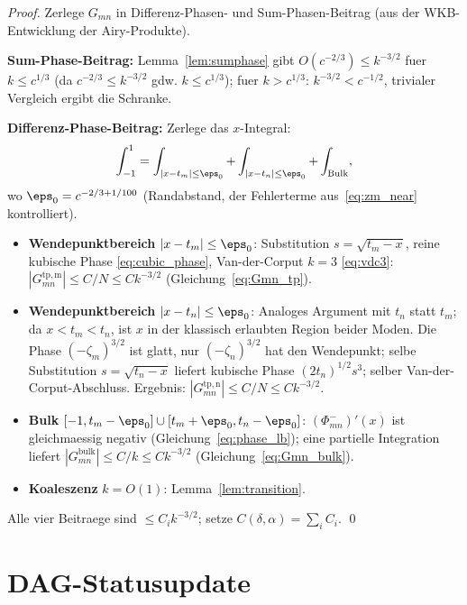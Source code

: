 \documentclass[12pt,a4paper]{amsart}
\theoremstyle{definition}
\newcommand{\zn}{\zeta_n}
\newcommand{\zm}{\zeta_m}
\newcommand{\tn}{t_n}
\newcommand{\tm}{t_m}
\newcommand{\Pm}{\Phi^-_{mn}}
\begin{document}
\begin{proof}
Zerlege $G_{mn}$ in Differenz-Phasen- und Sum-Phasen-Beitrag
(aus der WKB-Entwicklung der Airy-Produkte).

\textbf{Sum-Phase-Beitrag:} Lemma~\ref{lem:sumphase} gibt $O(c^{-2/3}) \le k^{-3/2}$
fuer $k \le c^{1/3}$ (da $c^{-2/3} \le k^{-3/2}$ gdw. $k \le c^{1/3}$);
fuer $k > c^{1/3}$: $k^{-3/2} < c^{-1/2}$, trivialer Vergleich ergibt die Schranke.

\textbf{Differenz-Phase-Beitrag:}
Zerlege das $x$-Integral:
\[
  \int_{-1}^{1} = \int_{|x-\tm|\le\eps_0} + \int_{|x-\tn|\le\eps_0} + \int_{\mathrm{Bulk}},
\]
wo $\eps_0 = c^{-2/3+1/100}$ (Randabstand, der Fehlerterme aus~\eqref{eq:zm_near} kontrolliert).

\begin{itemize}
  \item \textbf{Wendepunktbereich} $|x-\tm| \le \eps_0$:
    Substitution $s = \sqrt{\tm-x}$, reine kubische Phase \eqref{eq:cubic_phase},
    Van-der-Corput $k=3$ \eqref{eq:vdc3}:
    $|G_{mn}^{\mathrm{tp,m}}| \le C/N \le C k^{-3/2}$ (Gleichung~\eqref{eq:Gmn_tp}).

  \item \textbf{Wendepunktbereich} $|x-\tn| \le \eps_0$:
    Analoges Argument mit $\tn$ statt $\tm$;
    da $x < \tm < \tn$, ist $x$ in der klassisch erlaubten Region beider Moden.
    Die Phase $(-\zm)^{3/2}$ ist glatt, nur $(-\zn)^{3/2}$ hat den Wendepunkt;
    selbe Substitution $s = \sqrt{\tn-x}$ liefert kubische Phase $(2\tn)^{1/2}s^3$;
    selber Van-der-Corput-Abschluss. Ergebnis: $|G_{mn}^{\mathrm{tp,n}}| \le C/N \le Ck^{-3/2}$.

  \item \textbf{Bulk} $[-1, \tm-\eps_0] \cup [\tm+\eps_0, \tn-\eps_0]$:
    $(\Pm)'(x)$ ist gleichmaessig negativ (Gleichung~\eqref{eq:phase_lb});
    eine partielle Integration liefert $|G_{mn}^{\mathrm{bulk}}| \le C/k \le Ck^{-3/2}$
    (Gleichung~\eqref{eq:Gmn_bulk}).

  \item \textbf{Koaleszenz} $k = O(1)$:
    Lemma~\ref{lem:transition}.
\end{itemize}
Alle vier Beitraege sind $\le C_i k^{-3/2}$;
setze $C(\delta,\alpha) = \sum_i C_i$. \qed
\end{proof}

\section{DAG-Statusupdate}
\label{sec:dag}
\end{document}
